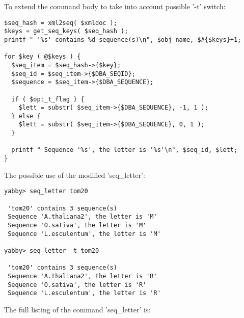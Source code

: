 To extend the command body to take into account possible '-t'
switch: 

\begin{verbatim}
$seq_hash = xml2seq( $xmldoc );
$keys = get_seq_keys( $seq_hash );
printf " '%s' contains %d sequence(s)\n", $obj_name, $#{$keys}+1;

for $key ( @$keys ) {
  $seq_item = $seq_hash->{$key};
  $seq_id = $seq_item->{$DBA_SEQID};
  $sequence = $seq_item->{$DBA_SEQUENCE};

  if ( $opt_t_flag ) {
    $lett = substr( $seq_item->{$DBA_SEQUENCE}, -1, 1 );
  } else {
    $lett = substr( $seq_item->{$DBA_SEQUENCE}, 0, 1 );
  }

  printf " Sequence '%s', the letter is '%s'\n", $seq_id, $lett;
}
\end{verbatim}

The possible use of the modified 'seq\_letter':

\begin{verbatim}
yabby> seq_letter tom20

 'tom20' contains 3 sequence(s)
 Sequence 'A.thaliana2', the letter is 'M'
 Sequence 'O.sativa', the letter is 'M'
 Sequence 'L.esculentum', the letter is 'M'

yabby> seq_letter -t tom20

 'tom20' contains 3 sequence(s)
 Sequence 'A.thaliana2', the letter is 'R'
 Sequence 'O.sativa', the letter is 'R'
 Sequence 'L.esculentum', the letter is 'R'
\end{verbatim}

The full listing of the command 'seq\_letter' is:


